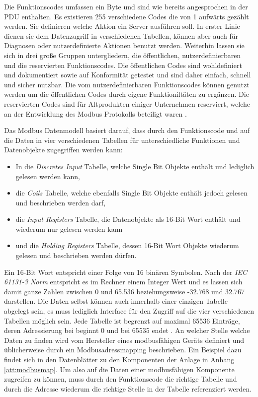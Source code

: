 Die Funktionscodes umfassen ein Byte und sind wie bereits angesprochen in der PDU enthalten. Es existieren 255 verschiedene Codes die von 1 aufwärts gezählt werden. Sie definieren welche Aktion ein Server ausführen soll. In erster Linie dienen sie dem Datenzugriff in verschiedenen Tabellen, können aber auch für Diagnosen oder nutzerdefinierte Aktionen benutzt werden. Weiterhin lassen sie sich in drei große Gruppen untergliedern, die öffentlichen, nutzerdefinierbaren und die reservierten Funktionscodes. Die öffentlichen Codes sind wohldefiniert und dokumentiert sowie auf Konformität getestet und sind daher einfach, schnell und sicher nutzbar. Die vom nutzerdefinierbaren Funktionscodes können genutzt werden um die öffentlichen Codes durch eigene Funktioniltäten zu ergänzen. Die reservierten Codes sind für Altprodukten einiger Unternehmen reserviert, welche an der Entwicklung des Modbus Protokolls beteiligt waren \cite[S.~10ff.]{mod12}.

Das Modbus Datenmodell basiert darauf, dass durch den Funktionscode und auf die Daten in vier verschiedenen Tabellen für unterschiedliche Funktionen und Datenobjekte zugegriffen werden kann:
\begin{itemize}
	\item In die \textit{Discretes Input} Tabelle, welche Single Bit Objekte enthält und lediglich gelesen werden kann,
	\item die \textit{Coils} Tabelle, welche ebenfalls Single Bit Objekte enthält jedoch gelesen und beschrieben werden darf,
	\item die \textit{Input Registers} Tabelle, die Datenobjekte als 16-Bit Wort enthält und wiederum nur gelesen werden kann
	\item und die \textit{Holding Registers} Tabelle, dessen 16-Bit Wort Objekte wiederum gelesen und beschrieben werden dürfen.
\end{itemize}

Ein 16-Bit Wort entspricht einer Folge von 16 binären Symbolen. Nach der \textit{IEC 61131-3 Norm} entspricht es im Rechner einem Integer Wert und es lassen sich damit ganze Zahlen zwischen 0 und 65.536 beziehungsweise -32.768 und 32.767 darstellen.
Die Daten selbst können auch innerhalb einer einzigen Tabelle abgelegt sein, es muss lediglich Interface für den Zugriff auf die vier verschiedenen Tabellen möglich sein. Jede Tabelle ist begrenzt auf maximal 65536 Einträge, deren Adressierung bei beginnt 0 und bei 65535 endet \cite[S.~6ff.]{mod12}. An welcher Stelle welche Daten zu finden wird vom Hersteller eines modbusfähigen Geräts definiert und üblicherweise durch ein Modbusadressmapping beschrieben. Ein Beispiel dazu findet sich in den Datenblätter zu den Komponenten der Anlage in Anhang \ref{att:modbusmap}.
Um also auf die Daten einer modbusfähigen Komponente zugreifen zu können, muss durch den Funktionscode die richtige Tabelle und durch die Adresse wiederum die richtige Stelle in der Tabelle referenziert werden.

